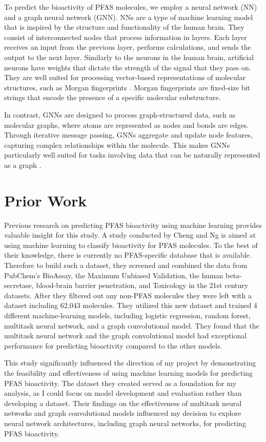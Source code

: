 \documentclass[10pt,twocolumn]{article}
\begin{document}
To predict the bioactivity of PFAS molecules, we employ a neural network (NN) and a graph neural network (GNN). NNs are a type of machine learning model that is inspired by the structure and functionality of the human brain. They consist of interconnected nodes that process information in layers. Each layer receives an input from the previous layer, performs calculations, and sends the output to the next layer. Similarly to the neurons in the human brain, artificial neurons have weights that dictate the strength of the signal that they pass on. They are well suited for processing vector-based representations of molecular structures, such as Morgan fingerprints \textcite{nn}. Morgan fingerprints are fixed-size bit strings that encode the presence of a specific molecular substructure. 

In contrast, GNNs are designed to process graph-structured data, such as molecular graphs, where atoms are represented as nodes and bonds are edges. Through iterative message passing, GNNs aggregate and update node features, capturing complex relationships within the molecule. This makes GNNs particularly well suited for tasks involving data that can be naturally represented as a graph \textcite{gnn}. 

\section{Prior Work}

Previous research on predicting PFAS bioactivity using machine learning provides valuable insight for this study. A study conducted by Cheng and Ng is aimed at using machine learning to classify bioactivity for PFAS molecules. To the best of their knowledge, there is currently no PFAS-specific database that is available. Therefore to build such a dataset, they screened and combined the data from PubChem’s BioAssay, the Maximum Unbiased Validation, the human beta-secretase, blood-brain barrier penetration, and Toxicology in the 21st century datasets. After they filtered out any non-PFAS molecules they were left with a dataset including 62,043 molecules. They utilized this new dataset and trained 4 different machine-learning models, including logistic regression, random forest, multitask neural network, and a graph convolutional model. They found that the multitask neural network and the graph convolutional model had exceptional performance for predicting bioactivity compared to the other models. 

This study significantly influenced the direction of my project by demonstrating the feasibility and effectiveness of using machine learning models for predicting PFAS bioactivity. The dataset they created served as a foundation for my analysis, as I could focus on model development and evaluation rather than developing a dataset. Their findings on the effectiveness of multitask neural networks and graph convolutional models influenced my decision to explore neural network architectures, including graph neural networks, for predicting PFAS bioactivity. 
\end{document}
